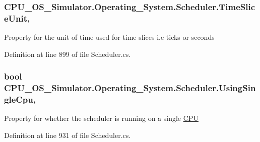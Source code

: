 \subsubsection[{Time\+Slice\+Unit}]{ C\+P\+U\+\_\+\+O\+S\+\_\+\+Simulator.\+Operating\+\_\+\+System.\+Scheduler.\+Time\+Slice\+Unit\hspace{0.3cm}{\ttfamily [get]}, {\ttfamily [set]}}\label{class_c_p_u___o_s___simulator_1_1_operating___system_1_1_scheduler_aaf31b58cc7c6e632c0ce7ca34612e1ba}


Property for the unit of time used for time slices i.\+e ticks or seconds 



Definition at line 899 of file Scheduler.\+cs.

\hypertarget{class_c_p_u___o_s___simulator_1_1_operating___system_1_1_scheduler_a3637999160bc25da430731042f42dd81}{}
\subsubsection[{Using\+Single\+Cpu}]{\setlength{\rightskip}{0pt plus 5cm}bool C\+P\+U\+\_\+\+O\+S\+\_\+\+Simulator.\+Operating\+\_\+\+System.\+Scheduler.\+Using\+Single\+Cpu\hspace{0.3cm}{\ttfamily [get]}, {\ttfamily [set]}}\label{class_c_p_u___o_s___simulator_1_1_operating___system_1_1_scheduler_a3637999160bc25da430731042f42dd81}


Property for whether the scheduler is running on a single \hyperlink{namespace_c_p_u___o_s___simulator_1_1_c_p_u}{C\+P\+U} 



Definition at line 931 of file Scheduler.\+cs.

\hypertarget{class_c_p_u___o_s___simulator_1_1_operating___system_1_1_scheduler_aac41827d1eff5710d0a9b5ea664dd99f}{}
